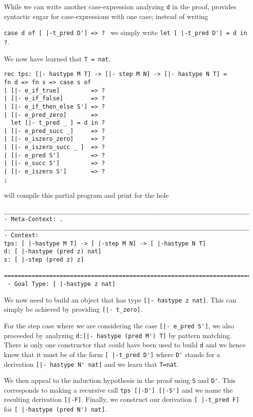 While we can write another case-expression analyzing \lstinline!d! in the proof,
\beluga provides syntactic sugar for case-expressions with one case; instead of
writing

\noindent
\lstinline!case d of [ |-t_pred D'] => ? ! we simply write
\lstinline!let [ |-t_pred D'] = d in ?!.

\noindent
We now have learned that \lstinline!T = nat!.

\begin{lstlisting}
rec tps: [|- hastype M T] -> [|- step M N] -> [|- hastype N T] =
fn d => fn s => case s of
| [|- e_if_true]         => ?
| [|- e_if_false]        => ?
| [|- e_if_then_else S'] => ?
| [|- e_pred_zero]       =>
  let [|- t_pred _ ] = d in ?
| [|- e_pred_succ _]     => ?
| [|- e_iszero_zero]     => ?
| [|- e_iszero_succ _ ]  => ?
| [|- e_pred S']         => ?
| [|- e_succ S']         => ?
| [|- e_iszero S']       => ?
;
\end{lstlisting}

\beluga will compile this partial program and print for the hole

\begin{lstlisting}
________________________________________________________________________________
- Meta-Context: .
________________________________________________________________________________
- Context:
tps: [ |-hastype M T] -> [ |-step M N] -> [ |-hastype N T]
d: [ |-hastype (pred z) nat]
s: [ |-step (pred z) z]

================================================================================
 - Goal Type: [ |-hastype z nat]
\end{lstlisting}

We now need to build an object that has type \lstinline![|- hastype z nat]!.
This can simply be achieved by providing \lstinline![|- t_zero]!.

For the step case where we are considering the case \lstinline![|- e_pred S']!,
we also proceeded by analyzing \lstinline!d:[|- hastype (pred M') T]! by pattern
matching. There is only one constructor that could have been used to build
\lstinline!d! and we hence know that it must be of the form
\lstinline![ |-t_pred D']! where \lstinline!D'! stands for a derivation
\lstinline![|- hastype N' nat]! and we learn that \lstinline!T=nat!.

We then appeal to the induction hypothesis in the proof using \lstinline!S!
and \lstinline!D'!. This corresponds to making a recursive call
\lstinline!tps [|-D'] [|-S']! and we name the resulting derivation
\lstinline![|-F]!. Finally, we construct our derivation
\lstinline![ |-t_pred F]! for \lstinline![ |-hastype (pred N') nat]!.

